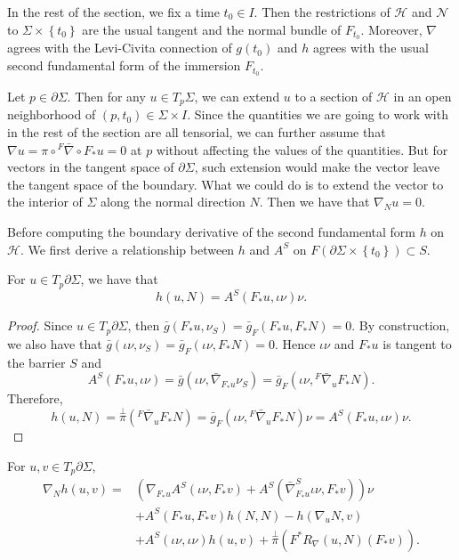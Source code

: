 In the rest of the section, we fix a time $t_0 \in I$. Then the restrictions of $\mathcal{H} $ and $\mathcal{N} $  to $\Sigma \times \left\{ t_0 \right\} $ are the usual tangent and the normal bundle of $F_{t_0}$. Moreover, $\nabla $ agrees with the Levi-Civita connection of $g(t_0)$ and $h$ agrees with the usual second fundamental form of the immersion $F_{t_0}$. 

Let $p \in \partial \Sigma $. Then for any $u \in T_p \Sigma $, we can extend $u$ to a section of $\mathcal{H} $ in an open neighborhood of $(p,t_0) \in \Sigma \times I$. Since the quantities we are going to work with in the rest of the section are all tensorial, we can further assume that $\nabla u = \pi \circ {}^F \bar{\nabla } \circ F_* u = 0$ at $p$ without affecting the values of the quantities. But for vectors in the tangent space of $\partial \Sigma$, such extension would make the vector leave the tangent space of the boundary. What we could do is to extend the vector to the interior of $\Sigma $ along the normal direction $N$. Then we have that $\nabla _N u=0$.  

Before computing the boundary derivative of the second fundamental form $h$ on $\mathcal{H} $. We first derive a relationship between $h$ and $A^S$ on $F(\partial \Sigma \times \left\{ t_0 \right\} ) \subset S $.

\begin{lemma} \label{htoas}
    For $u \in T_p \partial \Sigma $, we have that 
    \[h(u,N)=A^S(F_{*}u, \iota \nu ) \nu. \] 
\end{lemma}

\begin{proof}
    Since $u \in T_p \partial \Sigma$, then $\bar{g}(F_* u, \nu _S)=\bar{g}_F(F_* u, F_* N)=0$. By construction, we also have that $\bar{g}(\iota \nu , \nu _S)=\bar{g}_F(\iota \nu , F_* N)=0$. Hence $\iota \nu $ and $F_*u$ is tangent to the barrier $S$ and 
    \[A^S(F_{*}u, \iota \nu )=\bar{g}(\iota \nu , \bar{\nabla }_{F_*u}\nu _S)=\bar{g}_F(\iota \nu ,{}^F \bar{\nabla } _u F_* N).\]
    Therefore,
    \[h(u,N)=\overset{\perp }{\pi} ({}^F \bar{\nabla } _u F_* N)= \bar{g}_F(\iota \nu ,{}^F \bar{\nabla } _u F_* N) \nu = A^S(F_{*}u, \iota \nu ) \nu .\] 
\end{proof}

\begin{theorem}
    For $u,v \in T_p \partial \Sigma $, 
    \begin{equation*}
        \begin{split}
            \nabla _N h(u,v)
            =& \left( \nabla _{F_*u}A^S(\iota \nu , F_*v)+A^S(\bar{\nabla }^{S}_{F_*u} \iota \nu , F_*v)  \right)   \nu \\
            & +A^S(F_*u, F_* v)h(N,N)-h(\nabla_u N, v) \\
            & + A^S(\iota  \nu  , \iota \nu )h(u,v) +\overset{\perp }{\pi} (F^*R_{\nabla }(u,N)(F_* v)).
    \end{split}
    \end{equation*}    
\end{theorem}

